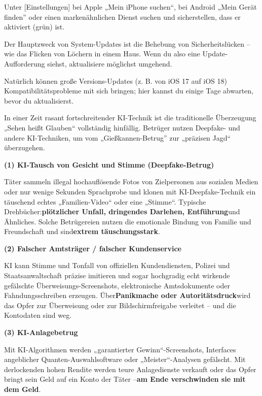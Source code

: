 Unter [Einstellungen] bei Apple „Mein iPhone suchen“, bei Android „Mein Gerät finden” oder einen markenähnlichen Dienst suchen und sicherstellen, dass er aktiviert (grün) ist.


Der Hauptzweck von System-Updates ist die Behebung von Sicherheitslücken – wie das Flicken von Löchern in einem Haus. Wenn du also eine Update-Aufforderung siehst, aktualisiere möglichst umgehend.

Natürlich können große Versions-Updates (z. B. von iOS 17 auf iOS 18) Kompatibilitätsprobleme mit sich bringen; hier kannst du einige Tage abwarten, bevor du aktualisierst.


In einer Zeit rasant fortschreitender KI-Technik ist die traditionelle Überzeugung „Sehen heißt Glauben“ vollständig hinfällig. Betrüger nutzen Deepfake- und andere KI-Techniken, um vom „Gießkannen-Betrug” zur „präzisen Jagd“ überzugehen.


\textbf{(1) KI-Tausch von Gesicht und Stimme (Deepfake-Betrug)}\par

Täter sammeln illegal hochauflösende Fotos von Zielpersonen aus sozialen Medien oder nur wenige Sekunden Sprachprobe und klonen mit KI-Deepfake-Technik ein täuschend echtes „Familien-Video“ oder eine „Stimme“. Typische Drehbücher:\textbf{plötzlicher Unfall, dringendes Darlehen, Entführung}und Ähnliches. Solche Betrügereien nutzen die emotionale Bindung von Familie und Freundschaft und sind\textbf{extrem täuschungsstark}.

\textbf{(2) Falscher Amtsträger / falscher Kundenservice}\par

KI kann Stimme und Tonfall von offiziellen Kundendiensten, Polizei und Staatsanwaltschaft präzise imitieren und sogar hochgradig echt wirkende gefälschte Überweisungs-Screenshots, elektronische Amtsdokumente oder Fahndungsschreiben erzeugen. Über\textbf{Panikmache oder Autoritätsdruck}wird das Opfer zur Überweisung oder zur Bildschirmfreigabe verleitet – und die Kontodaten sind weg.

\textbf{(3) KI-Anlagebetrug}\par

Mit KI-Algorithmen werden „garantierter Gewinn“-Screenshots, Interfaces angeblicher Quanten-Auswahlsoftware oder „Meister“-Analysen gefälscht. Mit derlockenden hohen Rendite werden teure Anlagedienste verkauft oder das Opfer bringt sein Geld auf ein Konto der Täter –\textbf{am Ende verschwinden sie mit dem Geld}.

